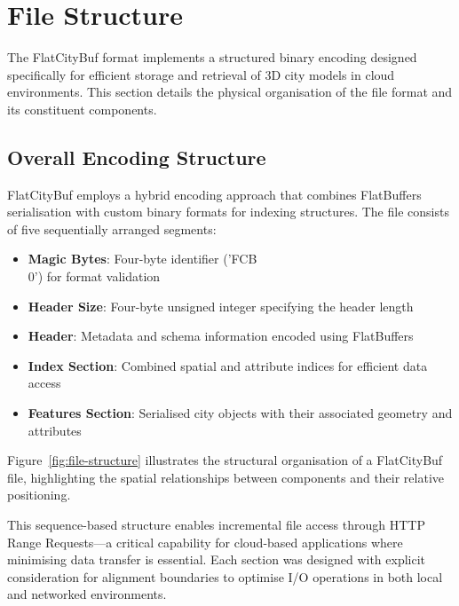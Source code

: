 \section{File Structure}
\label{sec:file_structure}

The FlatCityBuf format implements a structured binary encoding designed specifically for efficient storage and retrieval of 3D city models in cloud environments. This section details the physical organisation of the file format and its constituent components.

\subsection{Overall Encoding Structure}
\label{subsec:overall_encoding_structure}

FlatCityBuf employs a hybrid encoding approach that combines FlatBuffers serialisation with custom binary formats for indexing structures. The file consists of five sequentially arranged segments:

\begin{itemize}
  \item \textbf{Magic Bytes}: Four-byte identifier ('FCB\\0') for format validation
  \item \textbf{Header Size}: Four-byte unsigned integer specifying the header length
  \item \textbf{Header}: Metadata and schema information encoded using FlatBuffers
  \item \textbf{Index Section}: Combined spatial and attribute indices for efficient data access
  \item \textbf{Features Section}: Serialised city objects with their associated geometry and attributes
\end{itemize}

Figure~\ref{fig:file-structure} illustrates the structural organisation of a FlatCityBuf file, highlighting the spatial relationships between components and their relative positioning.


This sequence-based structure enables incremental file access through HTTP Range Requests—a critical capability for cloud-based applications where minimising data transfer is essential. Each section was designed with explicit consideration for alignment boundaries to optimise I/O operations in both local and networked environments.

